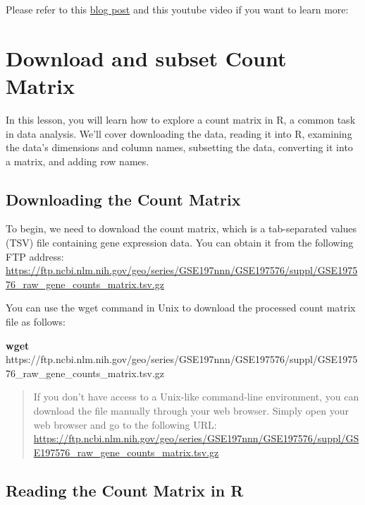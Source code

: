\documentclass[
]{book}
\newenvironment{Shaded}{\begin{snugshade}}{\end{snugshade}}
\newcommand{\FunctionTok}[1]{\textcolor[rgb]{0.13,0.29,0.53}{\textbf{#1}}}
\newcommand{\NormalTok}[1]{#1}
\begin{document}
Please refer to this \href{https://divingintogeneticsandgenomics.com/post/how-to-preprocess-geo-bulk-rnaseq-data-with-salmon/}{blog post} and this youtube video if you want to learn more:

\hypertarget{download-and-subset-count-matrix}{%
\section{Download and subset Count Matrix}\label{download-and-subset-count-matrix}}

In this lesson, you will learn how to explore a count matrix in R, a common task in data analysis. We'll cover downloading the data, reading it into R, examining the data's dimensions and column names, subsetting the data, converting it into a matrix, and adding row names.

\hypertarget{downloading-the-count-matrix}{%
\subsection{Downloading the Count Matrix}\label{downloading-the-count-matrix}}

To begin, we need to download the count matrix, which is a tab-separated values (TSV) file containing gene expression data. You can obtain it from the following FTP address: \url{https://ftp.ncbi.nlm.nih.gov/geo/series/GSE197nnn/GSE197576/suppl/GSE197576_raw_gene_counts_matrix.tsv.gz}

You can use the wget command in Unix to download the processed count matrix file as follows:

\begin{Shaded}
\begin{Highlighting}[]
\FunctionTok{wget}\NormalTok{ https://ftp.ncbi.nlm.nih.gov/geo/series/GSE197nnn/GSE197576/suppl/GSE197576\_raw\_gene\_counts\_matrix.tsv.gz}
\end{Highlighting}
\end{Shaded}

\begin{quote}
If you don't have access to a Unix-like command-line environment, you can download the file manually through your web browser. Simply open your web browser and go to the following URL: \url{https://ftp.ncbi.nlm.nih.gov/geo/series/GSE197nnn/GSE197576/suppl/GSE197576_raw_gene_counts_matrix.tsv.gz}
\end{quote}

\hypertarget{reading-the-count-matrix-in-r}{%
\subsection{Reading the Count Matrix in R}\label{reading-the-count-matrix-in-r}}
\end{document}
